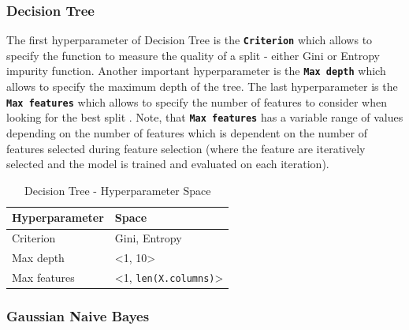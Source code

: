 \subsubsection{Decision Tree}
The first hyperparameter of Decision Tree is the \textbf{\texttt{Criterion}} which allows to specify the function to measure the quality of a split - either Gini or Entropy impurity function.
Another important hyperparameter is the \textbf{\texttt{Max depth}} which allows to specify the maximum depth of the tree.
The last hyperparameter is the \textbf{\texttt{Max features}} which allows to specify the number of features to consider when looking for the best split \citep{scikit-dt}.
Note, that \textbf{\texttt{Max features}} has a variable range of values depending on the number of features which is dependent on the number of features selected during feature selection (where the feature are iteratively selected and the model is trained and evaluated on each iteration).
\begin{table}[H]
\small
\setlength{\tabcolsep}{8pt}
\renewcommand{\arraystretch}{1.3}
\centering
    \caption[Decision Tree - Hyperparameter Space]{Decision Tree - Hyperparameter Space}\label{tab:dtspace}
    \begin{tabular}{ll}
\toprule
\textbf{Hyperparameter} & \textbf{Space}\\
\midrule
\hline
Criterion & Gini, Entropy \\
Max depth & <1, 10> \\
Max features & <1, \verb|len(X.columns)|>  \\
\hline
\bottomrule
\end{tabular}
\vspace{0.7em}

\vspace{-1em}
\end{table}

\subsubsection{Gaussian Naive Bayes}


